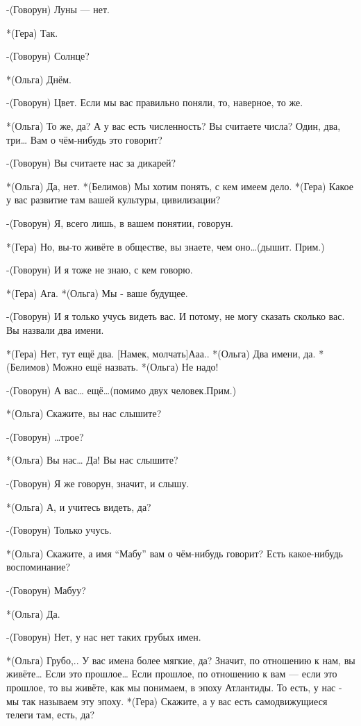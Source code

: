 -(Говорун) Луны — нет.

*(Гера) Так.

-(Говорун) Солнце? 

*(Ольга) Днём. 

-(Говорун) Цвет. Если мы вас правильно поняли, то, наверное, то же. 

*(Ольга) То же, да? А у вас есть численность? Вы считаете числа? Один, два, три… Вам о чём-нибудь это говорит?

-(Говорун) Вы считаете нас за дикарей?

*(Ольга) Да, нет.
*(Белимов) Мы хотим понять, с кем имеем дело. 
*(Гера) Какое у вас развитие там вашей культуры, цивилизации?

-(Говорун) Я, всего лишь, в вашем понятии, говорун.

*(Гера) Но, вы-то живёте в обществе, вы знаете, чем оно…(дышит. Прим.)

-(Говорун) И я тоже не знаю, с кем говорю.

*(Гера) Ага.
*(Ольга)  Мы - ваше будущее.

-(Говорун) И я только учусь видеть вас. И  потому, не могу сказать сколько вас. Вы назвали два имени.

*(Гера) Нет, тут ещё два. [Намек, молчать]Ааа..
*(Ольга) Два имени, да.
*(Белимов) Можно ещё назвать.
*(Ольга) Не надо!

-(Говорун) А вас… ещё…(помимо двух человек.Прим.)

*(Ольга) Скажите, вы нас слышите?

-(Говорун) …трое?

*(Ольга) Вы нас… Да! Вы нас слышите?

-(Говорун) Я же говорун, значит, и слышу.

*(Ольга) А, и учитесь видеть, да?

-(Говорун) Только учусь.

*(Ольга) Скажите, а имя “Мабу” вам о чём-нибудь говорит? Есть какое-нибудь воспоминание?

-(Говорун) Мабуу?

*(Ольга) Да.

-(Говорун) Нет, у нас нет таких грубых имен.

*(Ольга) Грубо,.. У вас имена более мягкие, да? Значит, по отношению к нам, вы живёте… Если это прошлое… Если прошлое, по отношению к вам — если это прошлое, то вы живёте, как мы понимаем, в эпоху Атлантиды. То есть, у нас - мы так называем эту эпоху.
*(Гера) Скажите, а у вас есть самодвижущиеся телеги там, есть, да?

